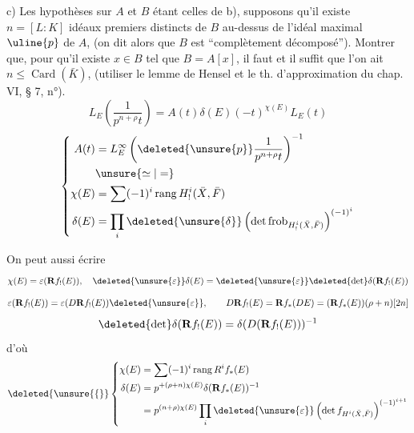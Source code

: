 c) Les hypothèses sur $A$ et $B$ étant celles de b), supposons qu'il existe $n=[L:K]$ idéaux premiers distincts de $B$ au-dessus de l'idéal maximal $\uline{p}$ de $A$, (on dit alors que $B$ est ``complètement décomposé''). Montrer que, pour qu'il existe $x\in B$ tel que $B=A[x]$, il faut et il suffit que l'on ait $n\leq\operatorname{Card}(\bar K)$, (utiliser le lemme de Hensel et le th. d'approximation du chap. VI, § 7, n°\quad).
\[\boxed{L_E\left(\frac1{p^{n+\rho}t}\right)=A(t)\delta(E)(-t)^{\chi(E)}L_E(t)}\]
\[
\left\{\begin{aligned}
A(t)&=L_E^\infty\left(\deleted{\unsure{p}}\frac1{p^{n+\rho}t}\right)^{-1}\\
&\unsure{\simeq|=}\\
\chi(E)&=\sum(-1)^i\operatorname{rang}H^i_!(\bar X,\bar F)\\
\delta(E)&=\prod_i\deleted{\unsure{\delta}}\left(\det\operatorname{frob}_{H^i_!(\bar X,\bar F)}\right)^{(-1)^i}
\end{aligned}\right.
\]

On peut aussi écrire
\[\chi(E)=\varepsilon(\mathbf R f_!(E)),\quad\deleted{\unsure{\varepsilon}}\delta(E)=\deleted{\unsure{\varepsilon}}\deleted{\det}\delta(\mathbf R f_!(E))\]
\[\varepsilon(\mathbf R f_!(E))=\varepsilon(D\mathbf R f_!(E))\deleted{\unsure{\varepsilon}},\qquad D\mathbf R f_!(E)=\mathbf R f_*(DE)=(\mathbf R f_*(E))(\rho+n)[2n]\]
\[\deleted{\det}\delta(\mathbf R f_!(E))=\delta(D(\mathbf R f_!(E)))^{-1}\]
d'où 
\[
\deleted{\unsure{\{}}\left\{\begin{aligned}
\chi(E)&=\sum(-1)^i\operatorname{rang}R^i f_*(E)\\
\delta(E)&=p^{+(\rho+n)\chi(E)}\delta(\mathbf R f_*(E))^{-1}\\
&=p^{(n+\rho)\chi(E)}\prod_i\deleted{\unsure{\varepsilon}}\left(\det f_{H^i(\bar X,\bar F)}\right)^{(-1)^{i+1}}
\end{aligned}\right.
\]

